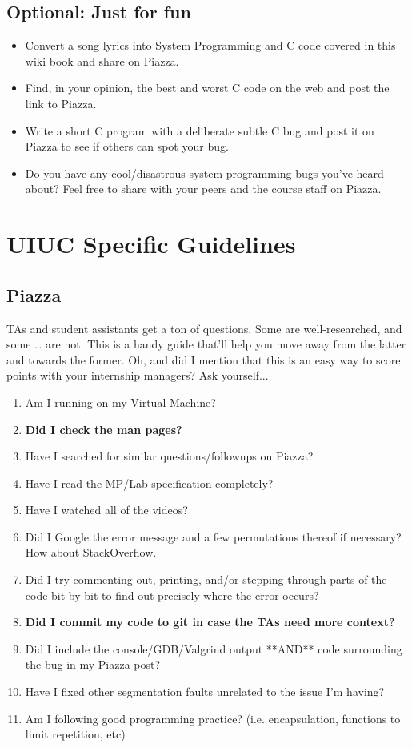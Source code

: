 \subsection{Optional: Just for fun}

\begin{itemize}
\item Convert a song lyrics into System Programming and C code covered in this wiki book and share on Piazza.
\item Find, in your opinion, the best and worst C code on the web and post the link to Piazza.
\item Write a short C program with a deliberate subtle C bug and post it on Piazza to see if others can spot your bug.
\item Do you have any cool/disastrous system programming bugs you've heard about? Feel free to share with your peers and the course staff on Piazza.
\end{itemize}

\section{UIUC Specific Guidelines}

\subsection{Piazza}

TAs and student assistants get a ton of questions.
Some are well-researched, and some \ldots{} are not.
This is a handy guide that'll help you move away from the latter and towards the former.
Oh, and did I mention that this is an easy way to score points with your internship managers? Ask yourself...

\begin{enumerate}
\item Am I running on my Virtual Machine?
\item \textbf{Did I check the man pages?}
\item Have I searched for similar questions/followups on Piazza?
\item Have I read the MP/Lab specification completely?
\item Have I watched all of the videos?
\item Did I Google the error message and a few permutations thereof if necessary? How about StackOverflow.
\item Did I try commenting out, printing, and/or stepping through parts of the code bit by bit to find out precisely where the error occurs?
\item \textbf{Did I commit my code to git in case the TAs need more context?}
\item Did I include the console/GDB/Valgrind output **AND** code surrounding the bug in my Piazza post?
\item Have I fixed other segmentation faults unrelated to the issue I'm having?
\item Am I following good programming practice? (i.e. encapsulation, functions to limit repetition, etc)
\end{enumerate}

